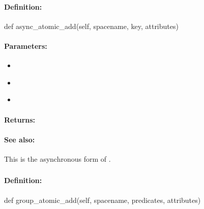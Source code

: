 \paragraph{Definition:}
\begin{pythoncode}
def async_atomic_add(self, spacename, key, attributes)
\end{pythoncode}

\paragraph{Parameters:}
\begin{itemize}[noitemsep]
\item {}\\

\item {}\\

\item {}\\

\end{itemize}

\paragraph{Returns:}


\paragraph{See also:}  This is the asynchronous form of .

\pagebreak
\subsubsection{}
\label{api:python:group_atomic_add}


\paragraph{Definition:}
\begin{pythoncode}
def group_atomic_add(self, spacename, predicates, attributes)
\end{pythoncode}


